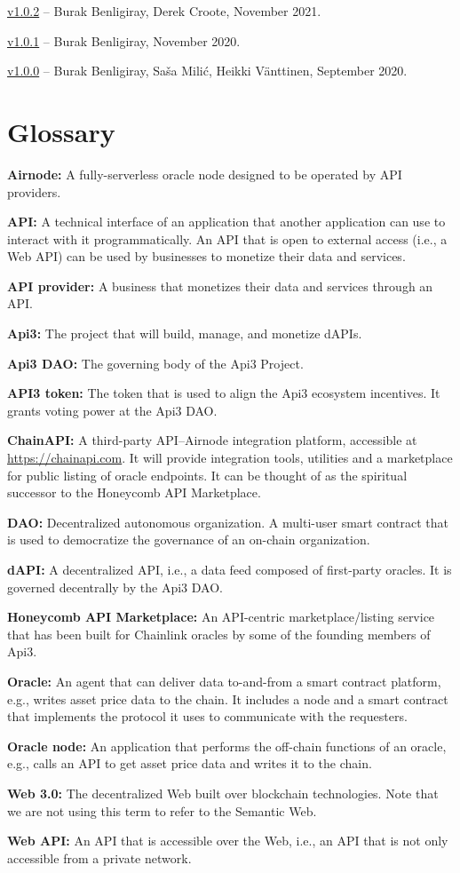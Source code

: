 \documentclass[11pt]{article}
\begin{document}
\href{https://github.com/api3dao/api3-whitepaper/releases/tag/v1.0.2}{v1.0.2} -- Burak Benligiray, Derek Croote, November 2021.

\href{https://github.com/api3dao/api3-whitepaper/releases/tag/v1.0.1}{v1.0.1} -- Burak Benligiray, November 2020.

\href{https://github.com/api3dao/api3-whitepaper/releases/tag/v1.0.0}{v1.0.0} -- Burak Benligiray, Sa\v{s}a Mili\'{c}, Heikki Vänttinen, September 2020.

\section{Glossary}

\textbf{Airnode:} A fully-serverless oracle node designed to be operated by API providers.

\textbf{API:} A technical interface of an application that another application can use to interact with it programmatically.
An API that is open to external access (i.e., a Web API) can be used by businesses to monetize their data and services.

\textbf{API provider:} A business that monetizes their data and services through an API.

\textbf{Api3:} The project that will build, manage, and monetize dAPIs.

\textbf{Api3 DAO:} The governing body of the Api3 Project.

\textbf{API3 token:} The token that is used to align the Api3 ecosystem incentives.
It grants voting power at the Api3 DAO.

\textbf{ChainAPI:} A third-party API--Airnode integration platform, accessible at \url{https://chainapi.com}.
It will provide integration tools, utilities and a marketplace for public listing of oracle endpoints.
It can be thought of as the spiritual successor to the Honeycomb API Marketplace.

\textbf{DAO:} Decentralized autonomous organization.
A multi-user smart contract that is used to democratize the governance of an on-chain organization.

\textbf{dAPI:} A decentralized API, i.e., a data feed composed of first-party oracles.
It is governed decentrally by the Api3 DAO.

\textbf{Honeycomb API Marketplace:} An API-centric marketplace/listing service that has been built for Chainlink oracles by some of the founding members of Api3.

\textbf{Oracle:} An agent that can deliver data to-and-from a smart contract platform, e.g., writes asset price data to the chain.
It includes a node and a smart contract that implements the protocol it uses to communicate with the requesters.

\textbf{Oracle node:} An application that performs the off-chain functions of an oracle, e.g., calls an API to get asset price data and writes it to the chain.

\textbf{Web 3.0:} The decentralized Web built over blockchain technologies.
Note that we are not using this term to refer to the Semantic Web.

\textbf{Web API:} An API that is accessible over the Web, i.e., an API that is not only accessible from a private network.
\end{document}
